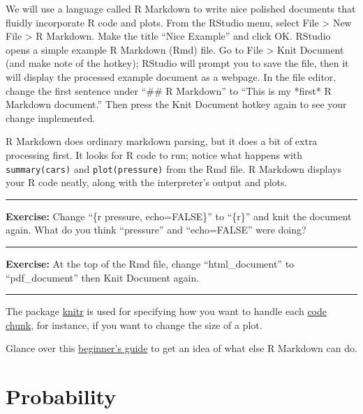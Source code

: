 \documentclass[]{book}
\theoremstyle{definition}
\theoremstyle{definition}
\theoremstyle{definition}
\theoremstyle{remark}
\begin{document}
We will use a language called R Markdown to write nice polished
documents that fluidly incorporate R code and plots. From the RStudio
menu, select File \textgreater{} New File \textgreater{} R Markdown.
Make the title ``Nice Example'' and click OK. RStudio opens a simple
example R Markdown (Rmd) file. Go to File \textgreater{} Knit Document
(and make note of the hotkey); RStudio will prompt you to save the file,
then it will display the processed example document as a webpage. In the
file editor, change the first sentence under ``\#\# R Markdown'' to
``This is my *first* R Markdown document.'' Then press the Knit Document
hotkey again to see your change implemented.

R Markdown does ordinary markdown parsing, but it does a bit of extra
processing first. It looks for R code to run; notice what happens with
\texttt{summary(cars)} and \texttt{plot(pressure)} from the Rmd file. R
Markdown displays your R code neatly, along with the interpreter's
output and plots.

\begin{center}\rule{0.5\linewidth}{\linethickness}\end{center}

\textbf{Exercise:} Change ``\{r pressure, echo=FALSE\}'' to ``\{r\}''
and knit the document again. What do you think ``pressure'' and
``echo=FALSE'' were doing?

\begin{center}\rule{0.5\linewidth}{\linethickness}\end{center}

\textbf{Exercise:} At the top of the Rmd file, change ``html\_document''
to ``pdf\_document'' then Knit Document again.

\begin{center}\rule{0.5\linewidth}{\linethickness}\end{center}

The package \href{https://yihui.name/knitr/options/}{knitr} is used for
specifying how you want to handle each
\href{https://rmarkdown.rstudio.com/lesson-3.html}{code chunk}, for
instance, if you want to change the size of a plot.

Glance over this
\href{http://www.stat.cmu.edu/~cshalizi/rmarkdown/}{beginner's guide} to
get an idea of what else R Markdown can do.

\hypertarget{probability}{%
\chapter{Probability}\label{probability}}
\end{document}
